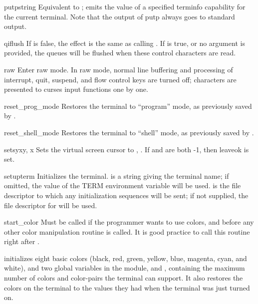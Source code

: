 \begin{funcdesc}{putp}{string}
Equivalent to ; emits the value of a
specified terminfo capability for the current terminal.  Note that the
output of putp always goes to standard output.
\end{funcdesc}

\begin{funcdesc}{qiflush}{  }
If  is false, the effect is the same as calling
. If  is true, or no argument is
provided, the queues will be flushed when these control characters are
read.
\end{funcdesc}

\begin{funcdesc}{raw}{}
Enter raw mode.  In raw mode, normal line buffering and 
processing of interrupt, quit, suspend, and flow control keys are
turned off; characters are presented to curses input functions one
by one.
\end{funcdesc}

\begin{funcdesc}{reset_prog_mode}{}
Restores the  terminal  to ``program'' mode, as previously saved 
by .
\end{funcdesc}

\begin{funcdesc}{reset_shell_mode}{}
Restores the  terminal  to ``shell'' mode, as previously saved 
by .
\end{funcdesc}

\begin{funcdesc}{setsyx}{y, x}
Sets the virtual screen cursor to , .
If  and  are both -1, then leaveok is set.  
\end{funcdesc}

\begin{funcdesc}{setupterm}{}
Initializes the terminal.   is a string giving the
terminal name; if omitted, the value of the TERM environment variable
will be used.   is the file descriptor to which any
initialization sequences will be sent; if not supplied, the file
descriptor for  will be used.
\end{funcdesc}

\begin{funcdesc}{start_color}{}
Must be called if the programmer wants to use colors, and before any
other color manipulation routine is called.  It is good
practice to call this routine right after .

 initializes eight basic colors (black, red, 
green, yellow, blue, magenta, cyan, and white), and two global
variables in the  module,  and
, containing the maximum number of colors and
color-pairs the terminal can support.  It also restores the colors on
the terminal to the values they had when the terminal was just turned
on.
\end{funcdesc}

